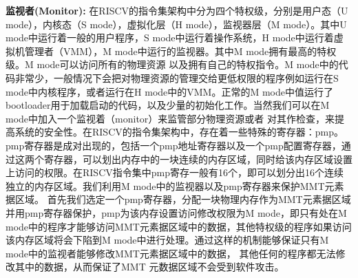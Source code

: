 \textbf{监视者(Monitor): }在RISCV的指令集架构中分为四个特权级，分别是用户态（U mode），内核态（S mode），虚拟化层（H mode），监视器层（M mode）。其中U mode中运行着一般的用户程序，S mode中运行着操作系统，H mode中运行着虚拟机管理者（VMM），M mode中运行的监视器。其中M mode拥有最高的特权级。M mode可以访问所有的物理资源
以及拥有自己的特权指令。M mode中的代码非常少，一般情况下会把对物理资源的管理交给更低权限的程序例如运行在S mode中内核程序，或者运行在H mode中的VMM。正常的M mode中值运行了bootloader用于加载启动的代码，以及少量的初始化工作。当然我们可以在M mode中加入一个监视着（monitor）来监管部分物理资源或者
对其作检查，来提高系统的安全性。在RISCV的指令集架构中，存在着一些特殊的寄存器：pmp。pmp寄存器是成对出现的，包括一个pmp地址寄存器以及一个pmp配置寄存器，通过这两个寄存器，可以划出内存中的一块连续的内存区域，同时给该内存区域设置上访问的权限。在RISCV指令集中pmp寄存一般有16个，即可以划分出16个连续独立的内存区域。我们利用M mode中的监视器以及pmp寄存器来保护MMT元素据区域。
首先我们选定一个pmp寄存器，分配一块物理内存作为MMT元素据区域并用pmp寄存器保护，pmp为该内存设置访问修改权限为M mode，即只有处在M mode中的程序才能够访问MMT元素据区域中的数据，其他特权级的程序如果访问该内存区域将会下陷到M mode中进行处理。通过这样的机制能够保证只有M mode中的监视者能够修改MMT元素据区域中的数据，
其他任何的程序都无法修改其中的数据，从而保证了MMT 元数据区域不会受到软件攻击。

